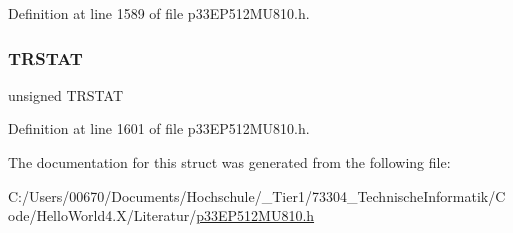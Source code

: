 Definition at line 1589 of file p33\+E\+P512\+M\+U810.\+h.

\mbox{\label{structtag_i2_c2_s_t_a_t_b_i_t_s_ab0728a3da8f26dbbebc4740b6b4c3531}} 
\subsubsection{\texorpdfstring{T\+R\+S\+T\+AT}{TRSTAT}}
{\footnotesize\ttfamily unsigned T\+R\+S\+T\+AT}



Definition at line 1601 of file p33\+E\+P512\+M\+U810.\+h.



The documentation for this struct was generated from the following file\+:\begin{DoxyCompactItemize}
\item 
C\+:/\+Users/00670/\+Documents/\+Hochschule/\+\_\+\+Tier1/73304\+\_\+\+Technische\+Informatik/\+Code/\+Hello\+World4.\+X/\+Literatur/\hyperlink{p33_e_p512_m_u810_8h}{p33\+E\+P512\+M\+U810.\+h}\end{DoxyCompactItemize}
